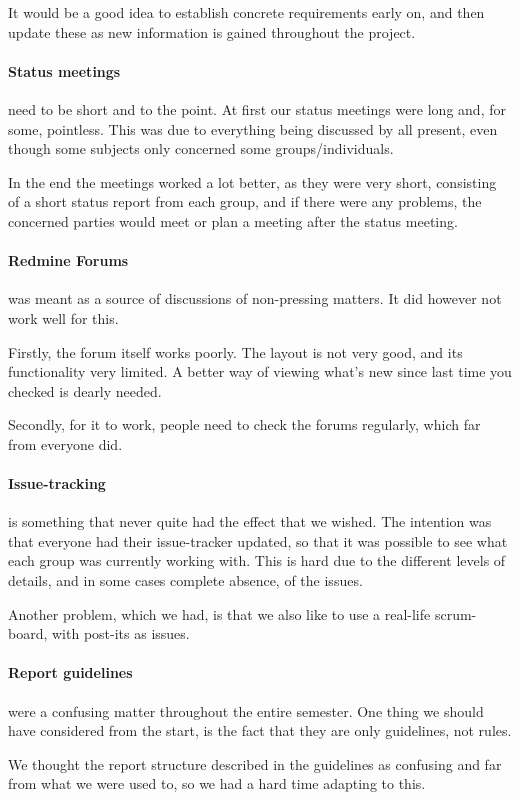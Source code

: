 It would be a good idea to establish concrete requirements early on, and then update these as new information is gained throughout the project.

\paragraph{Status meetings} need to be short and to the point.
At first our status meetings were long and, for some, pointless.
This was due to everything being discussed by all present, even though some subjects only concerned some groups/individuals.

In the end the meetings worked a lot better, as they were very short, consisting of a short status report from each group, and if there were any problems, the concerned parties would meet or plan a meeting after the status meeting.

\paragraph{Redmine Forums} was meant as a source of discussions of non-pressing matters.
It did however not work well for this.

Firstly, the forum itself works poorly.
The layout is not very good, and its functionality very limited.
A better way of viewing what's new since last time you checked is dearly needed.

Secondly, for it to work, people need to check the forums regularly, which far from everyone did.

\paragraph{Issue-tracking} is something that never quite had the effect that we wished.
The intention was that everyone had their issue-tracker updated, so that it was possible to see what each group was currently working with.
This is hard due to the different levels of details, and in some cases complete absence, of the issues.

Another problem, which we had, is that we also like to use a real-life scrum-board, with post-its as issues.

\paragraph{Report guidelines} were a confusing matter throughout the entire semester.
One thing we should have considered from the start, is the fact that they are only guidelines, not rules.

We thought the report structure described in the guidelines as confusing and far from what we were used to, so we had a hard time adapting to this.
